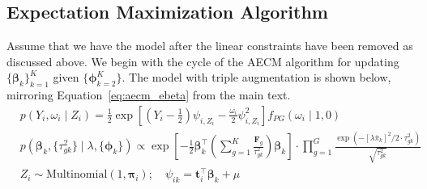 \subsection{Expectation Maximization Algorithm}
\label{sec:app_derivation_EM}

Assume that we have the model after the linear constraints have been removed as discussed above. We begin with the cycle of the AECM algorithm for updating $\{\bm{\beta}_k\}_{k=1}^K$ given $\{\bm{\phi}_{k=2}^K\}$.  The model with triple augmentation is shown below, mirroring Equation~\eqref{eq:aecm_ebeta} from the main text.
\begin{subequations}
	\label{app_eq:augmented}
	\begin{alignat}{2}
	&p(Y_i, \omega_{i} \mid Z_i) = \frac{1}{2} \exp\left[\left(Y_i - \frac{1}{2}\right)
          \psi_{i, Z_i} - \frac{\omega_{i}}{2} \psi_{i, Z_i}^2\right]
        f_{PG}(\omega_{i} \mid 1, 0) \\ 
	&p(\bm{\beta}_k, \{\tau^2_{gk}\} \mid \lambda, \{\bm{\phi}_k\}) \propto \exp\left[-\frac{1}{2}{\bm{\beta}}_k^\top\left(\sum_{g=1}^K \frac{{\bm{F}}_{g}}{\tau^2_{gk}}\right) {\bm{\beta}}_k\right] \cdot \prod_{g=1}^G \frac{\exp\left(-\left[\lambda \bar{\pi}_k\right]^2/2 \cdot \tau^2_{gk}\right)}{\sqrt{\tau^2_{gk}}} \\
	&Z_i \sim \mathrm{Multinomial}\left(1, \bm{\pi}_i\right); \quad \psi_{ik} = \bm{t}_i^\top \bm{\beta}_k + \mu
	\end{alignat}
\end{subequations}

